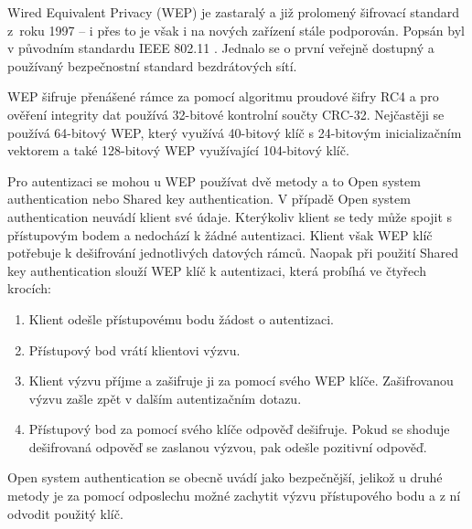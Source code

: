 Wired Equivalent Privacy (WEP) je zastaralý a již prolomený šifrovací standard z~roku 1997 -- i přes to je však i na nových zařízení stále podporován. Popsán byl v původním standardu IEEE 802.11 \cite{IEEE1997}. Jednalo se o první veřejně dostupný a používaný bezpečnostní standard bezdrátových sítí.

WEP šifruje přenášené rámce za pomocí algoritmu proudové šifry RC4 a pro ověření integrity dat používá 32-bitové kontrolní součty CRC-32. Nejčastěji se používá 64-bitový WEP, který využívá 40-bitový klíč s 24-bitovým inicializačním vektorem a také 128-bitový WEP využívající 104-bitový klíč. 

Pro autentizaci se mohou u WEP používat dvě metody a to Open system authentication nebo Shared key authentication. V případě Open system authentication neuvádí klient své údaje. Kterýkoliv klient se tedy může spojit s přístupovým bodem a nedochází k žádné autentizaci. Klient však WEP klíč potřebuje k dešifrování jednotlivých datových rámců. Naopak při použití Shared key authentication slouží WEP klíč k autentizaci, která probíhá ve čtyřech krocích:
\begin{enumerate}
  \item{Klient odešle přístupovému bodu žádost o autentizaci.}
  \item{Přístupový bod vrátí klientovi výzvu.}
  \item{Klient výzvu příjme a zašifruje ji za pomocí svého WEP klíče. Zašifrovanou výzvu zašle zpět v dalším autentizačním dotazu.}
  \item{Přístupový bod za pomocí svého klíče odpověď dešifruje. Pokud se shoduje dešifrovaná odpověď se zaslanou výzvou, pak odešle pozitivní odpověď.}
\end{enumerate}
Open system authentication se obecně uvádí jako bezpečnější, jelikož u druhé metody je za pomocí odposlechu možné zachytit výzvu přístupového bodu a z ní odvodit použitý klíč.

